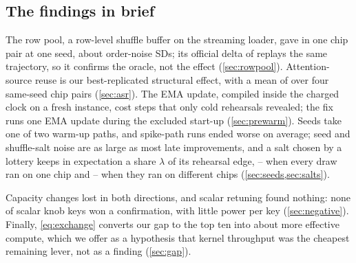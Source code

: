 \subsection{The findings in brief}

The row pool, a row-level shuffle buffer on the streaming loader, gave \docnum{} in one chip pair at
one seed, about  order-noise SDs; its official delta of  replays the same
trajectory, so it confirms the oracle, not the effect (\cref{sec:rowpool}). Attention-source reuse is our
best-replicated structural effect, with a mean of  over four same-seed chip pairs (\cref{sec:asr}). The
EMA update, compiled inside the charged clock on a fresh instance, cost \docnum{} steps that
only cold rehearsals revealed; the fix runs one EMA update during the excluded start-up (\cref{sec:prewarm}).
Seeds take one of two warm-up paths, and spike-path runs ended  worse on average; seed and
shuffle-salt noise are as large as most late improvements, and a salt chosen by a lottery keeps in expectation a
share $\lambda$ of its rehearsal edge, -- when every draw ran on one chip and
-- when they ran on different chips (\cref{sec:seeds,sec:salts}).

Capacity changes lost in both directions, and scalar retuning found nothing: none of \docnum{}
scalar knob keys won a confirmation, with little power per key (\cref{sec:negative}). Finally, \cref{eq:exchange}
converts our gap to the top ten into about  more
effective compute, which we offer as a hypothesis that kernel throughput was the cheapest remaining lever, not as a
finding (\cref{sec:gap}).
